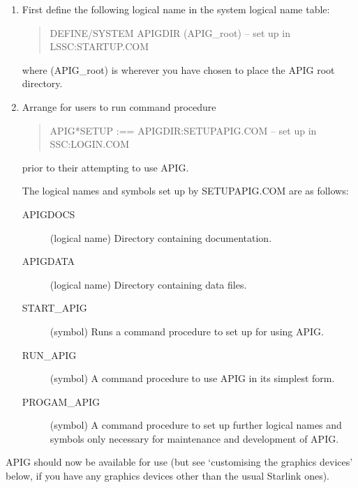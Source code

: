 \begin{enumerate}

  \item First define the following logical name in the system logical
   name table:

   \begin{verse}

DEFINE/SYSTEM  APIGDIR (APIG\_root) -- set up in LSSC:STARTUP.COM

   \end{verse}

   where (APIG\_root) is wherever you have chosen to place the APIG root
   directory.

  \item Arrange for users to run command procedure 

   \begin{verse}

APIG*SETUP :== APIGDIR:SETUPAPIG.COM  -- set up in SSC:LOGIN.COM

   \end{verse}

   prior to their attempting to use APIG.


   The logical names and symbols set up by SETUPAPIG.COM are as 
   follows:

   \begin{description}

     \item[APIGDOCS] (logical name) Directory containing documentation.

     \item[APIGDATA] (logical name) Directory containing data files.

     \item[START\_APIG] (symbol) Runs a command procedure to set up for
      using APIG.

     \item[RUN\_APIG] (symbol) A command procedure to use APIG in its
      simplest form.

     \item[PROGAM\_APIG] (symbol) A command procedure to set up further
      logical names and symbols only necessary for maintenance and
      development of APIG.

   \end{description}
\end{enumerate}

APIG should now be available for use (but see `customising the graphics
devices' below, if you have any graphics devices other than the usual
Starlink ones).

